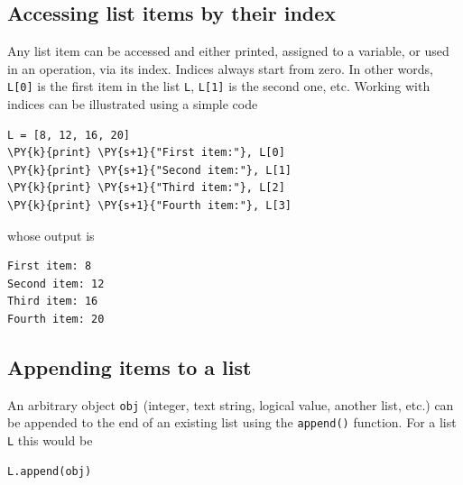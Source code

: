 \subsection[\ \ Accessing list items by their index]{Accessing list items by their index}

\noindent
Any list item can be accessed and either printed, assigned 
to a variable, or used in an operation, via its index. Indices 
always start from zero. In other words, {\tt L[0]} is the 
first item in the list {\tt L}, {\tt L[1]} is the second one, etc. 
Working with indices can be illustrated using a simple code\\

\begin{bbox}
\begin{Verbatim}[commandchars=\\\{\}]
L = [8, 12, 16, 20]
\PY{k}{print} \PY{s+1}{"First item:"}, L[0]
\PY{k}{print} \PY{s+1}{"Second item:"}, L[1]
\PY{k}{print} \PY{s+1}{"Third item:"}, L[2]
\PY{k}{print} \PY{s+1}{"Fourth item:"}, L[3]
\end{Verbatim}
\end{bbox}
\vspace{6mm}

\noindent
whose output is\\

\begin{ybox}
\begin{Verbatim}[commandchars=\\\{\}]
First item: 8
Second item: 12
Third item: 16
Fourth item: 20
\end{Verbatim}
\end{ybox}
\vspace{6mm}

\subsection[\ \ Appending items to a list]{Appending items to a list}

\noindent
An arbitrary object {\tt obj} (integer, text string, logical value, another list, etc.) can be appended 
to the end of an existing list using the {\tt append()} function. For a list {\tt L} this would be\\

\begin{bbox}
\begin{Verbatim}[commandchars=\\\{\}]
L.append(obj)
\end{Verbatim}
\end{bbox}
\vspace{6mm}


